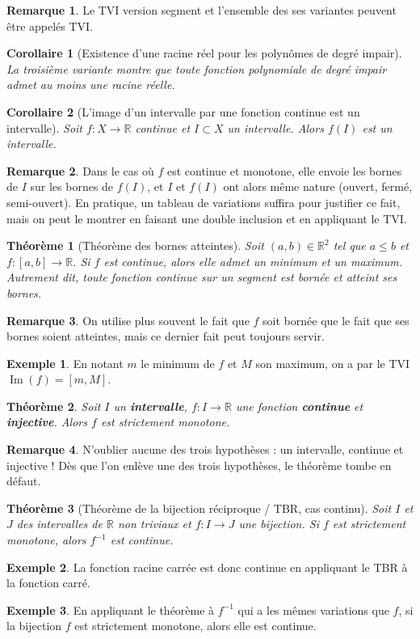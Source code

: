 \documentclass[french]{book}
\newcommand{\R}{\mathbb{R}}
\newcommand{\inv}{^{-1}}
\theoremstyle{plain}
\newtheorem{thm}{Théorème}[chapter]
\newtheorem{cor}{Corollaire}[chapter]
\theoremstyle{definition}
\newtheorem{exa}{Exemple}[chapter]
\newtheorem{rmq}{Remarque}[chapter]
\theoremstyle{remark}
\DeclareMathOperator{\im}{Im}
\begin{document}
\begin{rmq}
	Le TVI version segment et l'ensemble des ses variantes peuvent être appelés TVI.
\end{rmq}
\begin{cor}[Existence d'une racine réel pour les polynômes de degré impair]
	La troisième variante montre que toute fonction polynomiale de degré impair admet au moins une racine réelle.
\end{cor}
\begin{cor}[L'image d'un intervalle par une fonction continue est un intervalle]
	Soit $f:X\rightarrow\R$ continue et $I\subset X$ un intervalle. Alors $f(I)$ est un intervalle.
\end{cor}
\begin{rmq}
	Dans le cas où $f$ est continue et monotone, elle envoie les bornes de $I$ sur les bornes de $f(I)$, et $I$ et $f(I)$ ont alors même nature (ouvert, fermé, semi-ouvert). En pratique, un tableau de variations suffira pour justifier ce fait, mais on peut le montrer en faisant une double inclusion et en appliquant le TVI.
\end{rmq}
\begin{thm}[Théorème des bornes atteintes]
	Soit $(a,b)\in\R^2$ tel que $a\leqslant b$ et $f:[a,b]\rightarrow\R$. Si $f$ est continue, alors elle admet un minimum et un maximum. Autrement dit, toute fonction continue sur un segment est bornée et atteint ses bornes.
\end{thm}
\begin{rmq}
	On utilise plus souvent le fait que $f$ soit bornée que le fait que ses bornes soient atteintes, mais ce dernier fait peut toujours servir.
\end{rmq}
\begin{exa}
	En notant $m$ le minimum de $f$ et $M$ son maximum, on a par le TVI  $\im(f)=[m,M]$.
\end{exa}
\begin{thm}
	Soit $I$ un \textbf{intervalle}, $f:I\rightarrow\R$ une fonction \textbf{continue} et \textbf{injective}. Alors $f$ est strictement monotone.
\end{thm}
\begin{rmq}
	N'oublier aucune des trois hypothèses : un intervalle, continue et injective ! Dès que l'on enlève une des trois hypothèses, le théorème tombe en défaut.
\end{rmq}
\begin{thm}[Théorème de la bijection réciproque / TBR, cas continu]
	Soit $I$ et $J$ des intervalles de $\R$ non triviaux et $f:I\rightarrow J$ une bijection. Si $f$ est strictement monotone, alors $f\inv$ est continue.
\end{thm}
\begin{exa}
	La fonction racine carrée est donc continue en appliquant le TBR à la fonction carré.
\end{exa}
\begin{exa}
	En appliquant le théorème à $f\inv$ qui a les mêmes variations que $f$, si la bijection $f$ est strictement monotone, alors elle est continue.
\end{exa}
\end{document}

